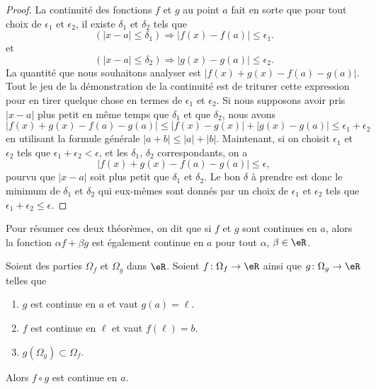 \begin{proof}
	La continuité des fonctions \( f\) et \( g\) au point \( a\) fait en sorte que pour tout choix de \( \epsilon_1\) et \( \epsilon_2\), il existe \( \delta_1\) et \( \delta_2\) tels que
	\[
		(| x-a |\leq \delta_1)\Rightarrow | f(x)-f(a) |\leq \epsilon_1.
	\]
	et
	\[
		(| x-a |\leq \delta_2)\Rightarrow | g(x)-g(a) |\leq \epsilon_2.
	\]
	La quantité que nous souhaitons analyser est \( | f(x)+g(x)-f(a)-g(a) |\). Tout le jeu de la démonstration de la continuité est de triturer cette expression pour en tirer quelque chose en termes de \( \epsilon_1\) et \( \epsilon_2\). Si nous supposons avoir pris \( | x-a |\) plus petit en même temps que \( \delta_1\) et que \( \delta_2\), nous avons
	\[
		| f(x)+g(x)-f(a)-g(a) |\leq| f(x)-g(x) |+| g(x)-g(a) |\leq\epsilon_1+\epsilon_2
	\]
	en utilisant la formule générale \( | a+b |\leq | a |+| b |\). Maintenant, si on choisit \( \epsilon_1\) et \( \epsilon_2\) tels que \( \epsilon_1+\epsilon_2<\epsilon\), et les \( \delta_1\), \( \delta_2\) correspondants, on a
	\[
		| f(x)+g(x)-f(a)-g(a) |\leq\epsilon,
	\]
	pourvu que \( | x-a |\) soit plus petit que \( \delta_1\) et \( \delta_2\). Le bon \( \delta\) à prendre est donc le minimum de \( \delta_1\) et \( \delta_2\) qui eux-mêmes sont donnés par un choix de \( \epsilon_1\) et \( \epsilon_2\) tels que \( \epsilon_1+\epsilon_2\leq\epsilon\).
\end{proof}

Pour résumer ces deux théorèmes, on dit que si \( f\) et \( g\) sont continues en \( a\), alors la fonction \( \alpha f+\beta g\) est également continue en \( a\) pour tout \( \alpha\), \( \beta\in\eR\).

\begin{proposition}     \label{PROPooVNKVooJvxarf}
	Soient des parties \( \Omega_f\) et \( \Omega_g\) dans \( \eR\). Soient \( f\colon \Omega_f\to \eR\) ainsi que \( g\colon \Omega_g\to \eR\) telles que
	\begin{enumerate}
		\item
		      \( g\) est continue en \( a\) et vaut \( g(a)=\ell\).
		\item
		      \( f\) est continue en \( \ell\) et vaut \( f(\ell)=b\).
		\item
		      \( g(\Omega_g)\subset \Omega_f\).
	\end{enumerate}
	Alors \( f\circ g\) est continue en \( a\).
\end{proposition}

